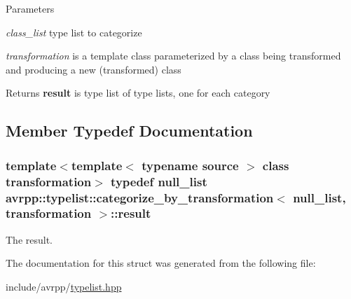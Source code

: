 \begin{DoxyParams}{Parameters}
\item[{\em class\_\-list}]type list to categorize \item[{\em transformation}]is a template class parameterized by a class being transformed and producing a new (transformed) class \end{DoxyParams}
\begin{DoxyReturn}{Returns}
{\bfseries result} is type list of type lists, one for each category 
\end{DoxyReturn}


\subsection{Member Typedef Documentation}
\hypertarget{structavrpp_1_1typelist_1_1categorize__by__transformation_3_01null__list_00_01transformation_01_4_aa24f5fa0d3249e06fb4bdab27866a100}{
\subsubsection[{result}]{\setlength{\rightskip}{0pt plus 5cm}template$<$template$<$ typename source $>$ class transformation$>$ typedef {\bf null\_\-list} avrpp::typelist::categorize\_\-by\_\-transformation$<$ {\bf null\_\-list}, transformation $>$::{\bf result}}}
\label{structavrpp_1_1typelist_1_1categorize__by__transformation_3_01null__list_00_01transformation_01_4_aa24f5fa0d3249e06fb4bdab27866a100}


The result. 



The documentation for this struct was generated from the following file:\begin{DoxyCompactItemize}
\item 
include/avrpp/\hyperlink{typelist_8hpp}{typelist.hpp}\end{DoxyCompactItemize}
